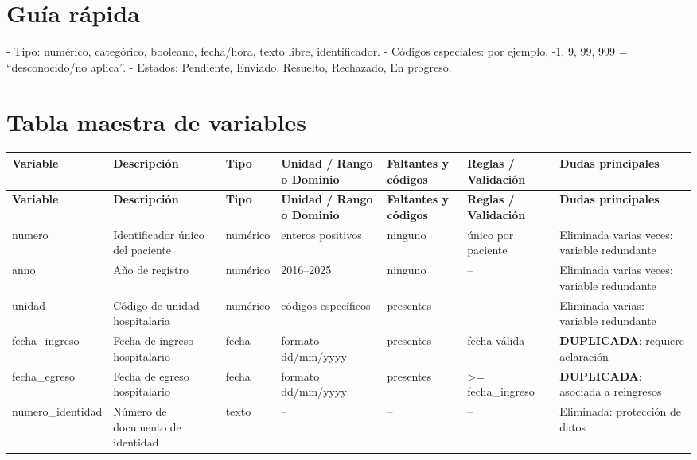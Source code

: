 \documentclass[11pt,a4paper]{article}
\renewcommand{\arraystretch}{1.2}
\begin{document}
\section*{Guía rápida}
- Tipo: numérico, categórico, booleano, fecha/hora, texto libre, identificador. 
- Códigos especiales: por ejemplo, -1, 9, 99, 999 = “desconocido/no aplica”. 
- Estados: Pendiente, Enviado, Resuelto, Rechazado, En progreso.

\section{Tabla maestra de variables}
\scriptsize
\setlength{\LTleft}{-1cm}
\setlength{\LTright}{-1cm}
\setlength{\tabcolsep}{1.5pt}
\renewcommand{\arraystretch}{1.15}
\begin{longtable}{@{}L{0.095\textwidth} L{0.17\textwidth} L{0.07\textwidth} L{0.16\textwidth} L{0.14\textwidth} L{0.13\textwidth} L{0.15\textwidth}@{}}
\toprule
\textbf{Variable} & \textbf{Descripción} & \textbf{Tipo} & \textbf{Unidad / Rango o Dominio} & \textbf{Faltantes y códigos} & \textbf{Reglas / Validación} & \textbf{Dudas principales} \\
\midrule
\endfirsthead
\toprule
\textbf{Variable} & \textbf{Descripción} & \textbf{Tipo} & \textbf{Unidad / Rango o Dominio} & \textbf{Faltantes y códigos} & \textbf{Reglas / Validación} & \textbf{Dudas principales} \\
\midrule
\endhead
numero & Identificador único del paciente & numérico & enteros positivos & ninguno & único por paciente & Eliminada varias veces: variable redundante \\
anno & Año de registro & numérico & 2016--2025 & ninguno & -- & Eliminada varias veces: variable redundante \\
unidad & Código de unidad hospitalaria & numérico & códigos específicos & presentes & -- & Eliminada varias: variable redundante \\
fecha\_ingreso & Fecha de ingreso hospitalario & fecha & formato dd/mm/yyyy & presentes & fecha válida & \textbf{DUPLICADA}: requiere aclaración \\
fecha\_egreso & Fecha de egreso hospitalario & fecha & formato dd/mm/yyyy & presentes & >= fecha\_ingreso & \textbf{DUPLICADA}: asociada a reingresos \\
numero\_identidad & Número de documento de identidad & texto & -- & -- & -- & Eliminada: protección de datos \\

\end{longtable}
\end{document}
